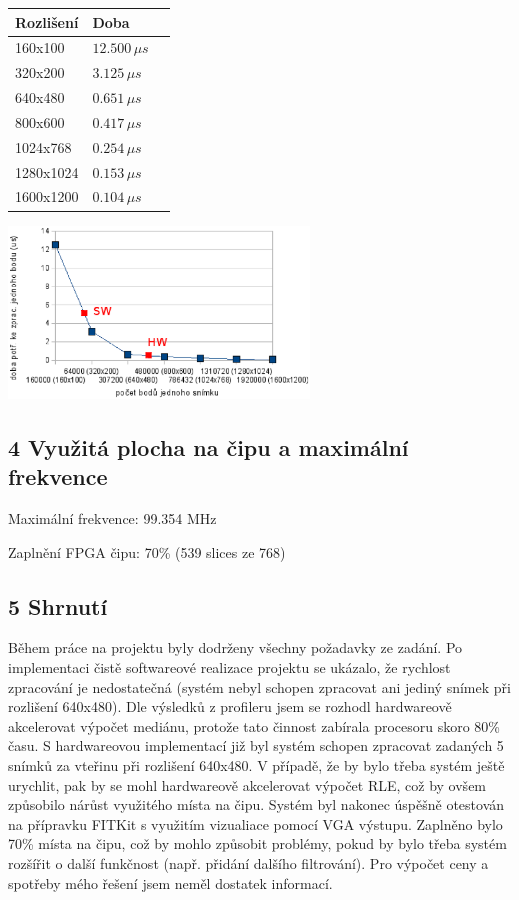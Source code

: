 \documentclass[12pt,a4paper]{article}
\begin{document}
\begin{multicols}{2}
	\noindent
	\vspace*{0.2cm}
	\begin{center}
		\begin{tabular}{| l | l | l |}
		\hline
		Rozlišení & Doba \\
		\hline
		160x100 & $12.500\,\mu{s}$ \\
		320x200 & $3.125\,\mu{s}$ \\
		640x480 & $0.651\,\mu{s}$ \\
		800x600 & $0.417\,\mu{s}$ \\
		1024x768 & $0.254\,\mu{s}$ \\
		1280x1024 & $0.153\,\mu{s}$ \\
		1600x1200 & $0.104\,\mu{s}$ \\
		\hline
		\end{tabular}
	\end{center}

	\noindent
	\begin{center}
		\includegraphics[width=8.0cm,keepaspectratio]{graph2}
	\end{center}
\end{multicols}

\subsection*{4 Využitá plocha na čipu a maximální frekvence}

\noindent
Maximální frekvence: 99.354 MHz

\noindent
Zaplnění FPGA čipu: 70\% (539 slices ze 768)

\subsection*{5 Shrnutí}

Během práce na projektu byly dodrženy všechny požadavky ze zadání.
Po implementaci čistě softwareové realizace projektu se ukázalo, že rychlost
zpracování je nedostatečná (systém nebyl schopen zpracovat ani jediný snímek
při rozlišení 640x480). Dle výsledků z profileru jsem se rozhodl hardwareově
akcelerovat výpočet mediánu, protože tato činnost zabírala procesoru skoro 80\%
času. S hardwareovou implementací již byl systém schopen zpracovat zadaných
5 snímků za vteřinu při rozlišení 640x480. V případě, že by bylo třeba systém
ještě urychlit, pak by se mohl hardwareově akcelerovat výpočet RLE, což by ovšem
způsobilo nárůst využitého místa na čipu.
Systém byl nakonec úspěšně otestován na přípravku FITKit s využitím
vizualiace pomocí VGA výstupu.
Zaplněno bylo 70\% místa na čipu, což by mohlo způsobit problémy, pokud by bylo
třeba systém rozšířit o další funkčnost (např. přidání dalšího filtrování).
Pro výpočet ceny a spotřeby mého řešení jsem neměl dostatek informací.
\end{document}
